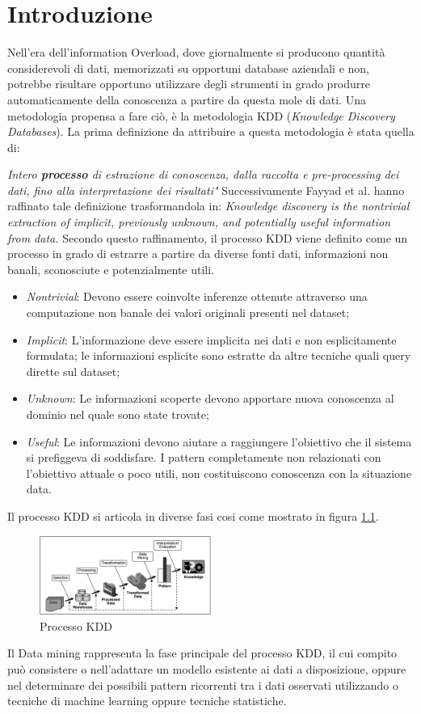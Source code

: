 \chapter{Introduzione}
Nell'era dell'information Overload, dove giornalmente si producono quantità considerevoli di dati, memorizzati su opportuni database aziendali e non, potrebbe risultare opportuno utilizzare degli strumenti in grado produrre automaticamente della conoscenza a partire da questa mole di dati. Una metodologia propensa a fare ciò, è la metodologia KDD (\emph{Knowledge Discovery Databases}). 
La prima definizione da attribuire a questa metodologia è stata quella di:

\emph{Intero \textbf{processo} di estrazione di conoscenza, dalla raccolta e pre-processing dei dati, fino alla interpretazione dei risultati"\cite{DBLP:conf/kdd/1995}}
Successivamente Fayyad et al. hanno raffinato tale definizione trasformandola in: 
\emph{Knowledge discovery is the nontrivial extraction of implicit, previously unknown, and potentially useful information from data.}\cite{citeulike:1550195} 
Secondo questo raffinamento, il processo KDD viene definito come un processo in grado di estrarre a partire da diverse fonti dati, informazioni non banali, sconosciute e potenzialmente utili. 
\begin{itemize}
	\item \emph{Nontrivial}: Devono essere coinvolte inferenze ottenute attraverso una computazione non banale dei valori originali presenti nel dataset;
	\item \emph{Implicit}: L'informazione deve essere implicita nei dati e non esplicitamente formulata; le informazioni esplicite sono estratte da altre tecniche quali query dirette sul dataset;
	\item \emph{Unknown}: Le informazioni scoperte devono apportare nuova conoscenza al dominio nel quale sono state trovate;
	\item \emph{Useful}: Le informazioni devono aiutare a raggiungere l'obiettivo che il sistema si prefiggeva di soddisfare. I pattern completamente non relazionati con l'obiettivo attuale o poco utili, non costituiscono conoscenza con la situazione data.
\end{itemize}
Il processo KDD si articola in diverse fasi cosi come mostrato in figura \ref{kddprocess}.
\begin{figure}[hbtp]
\centering
\includegraphics[width=0.5\textwidth]{./images/kddprocess.png}
\caption{Processo KDD}
\label{kddprocess}
\end{figure}
Il Data mining rappresenta la fase principale del processo KDD, il cui compito può consistere o nell'adattare un modello esistente ai dati a disposizione, oppure nel determinare dei possibili pattern ricorrenti tra i dati osservati utilizzando o tecniche di machine learning oppure tecniche statistiche. 

